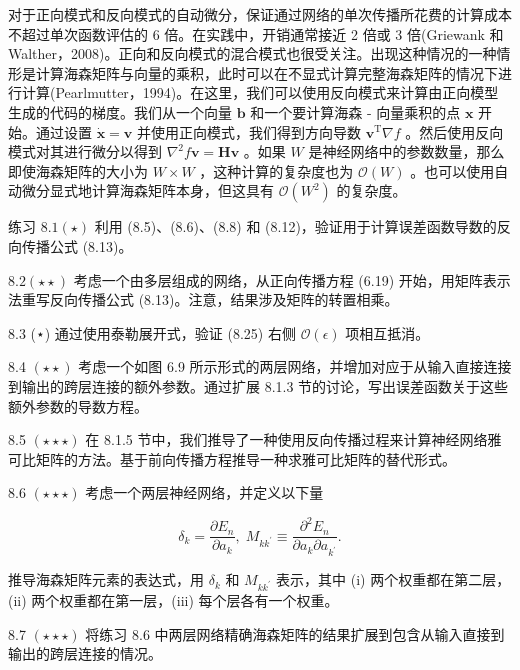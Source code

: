 \documentclass[10pt]{report}
\begin{document}
对于正向模式和反向模式的自动微分，保证通过网络的单次传播所花费的计算成本不超过单次函数评估的 6 倍。在实践中，开销通常接近 2 倍或 3 倍(Griewank 和 Walther，2008)。正向和反向模式的混合模式也很受关注。出现这种情况的一种情形是计算海森矩阵与向量的乘积，此时可以在不显式计算完整海森矩阵的情况下进行计算(Pearlmutter，1994)。在这里，我们可以使用反向模式来计算由正向模型生成的代码的梯度。我们从一个向量 \(\mathbf{b}\) 和一个要计算海森 - 向量乘积的点 \(\mathbf{x}\) 开始。通过设置 \(\dot{\mathbf{x}} = \mathbf{v}\) 并使用正向模式，我们得到方向导数 \({\mathbf{v}}^{\mathrm{T}}\nabla f\) 。然后使用反向模式对其进行微分以得到 \({\nabla }^{2}f\mathbf{v} = \mathbf{H}\mathbf{v}\) 。如果 \(W\) 是神经网络中的参数数量，那么即使海森矩阵的大小为 \(W \times  W\) ，这种计算的复杂度也为 \(\mathcal{O}\left( W\right)\) 。也可以使用自动微分显式地计算海森矩阵本身，但这具有 \(\mathcal{O}\left( {W}^{2}\right)\) 的复杂度。

练习 \({8.1}\left( \star \right)\) 利用 (8.5)、(8.6)、(8.8) 和 (8.12)，验证用于计算误差函数导数的反向传播公式 (8.13)。

\({8.2}\left( {\star  \star  }\right)\) 考虑一个由多层组成的网络，从正向传播方程 (6.19) 开始，用矩阵表示法重写反向传播公式 (8.13)。注意，结果涉及矩阵的转置相乘。

8.3 (⋆) 通过使用泰勒展开式，验证 (8.25) 右侧 \(\mathcal{O}\left( \epsilon \right)\) 项相互抵消。

8.4 \(\left( {\star  \star  }\right)\) 考虑一个如图 6.9 所示形式的两层网络，并增加对应于从输入直接连接到输出的跨层连接的额外参数。通过扩展 8.1.3 节的讨论，写出误差函数关于这些额外参数的导数方程。

8.5 \(\left( {\star  \star   \star  }\right)\) 在 8.1.5 节中，我们推导了一种使用反向传播过程来计算神经网络雅可比矩阵的方法。基于前向传播方程推导一种求雅可比矩阵的替代形式。

8.6 \(\left( {\star  \star   \star  }\right)\) 考虑一个两层神经网络，并定义以下量

\[
{\delta }_{k} = \frac{\partial {E}_{n}}{\partial {a}_{k}},\;{M}_{k{k}^{\prime }} \equiv  \frac{{\partial }^{2}{E}_{n}}{\partial {a}_{k}\partial {a}_{{k}^{\prime }}}. \tag{8.77}
\]

推导海森矩阵元素的表达式，用 \({\delta }_{k}\) 和 \({M}_{k{k}^{\prime }}\) 表示，其中 (i) 两个权重都在第二层，(ii) 两个权重都在第一层，(iii) 每个层各有一个权重。

8.7 \(\left( {\star  \star   \star  }\right)\) 将练习 8.6 中两层网络精确海森矩阵的结果扩展到包含从输入直接到输出的跨层连接的情况。
\end{document}
